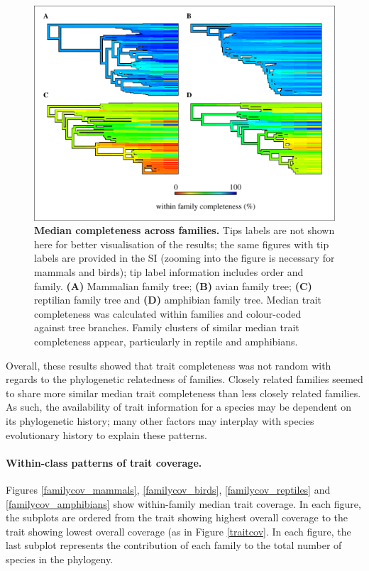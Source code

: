 \begin{figure}[h!]
\centering
\includegraphics[scale=0.75]{figures/chapter2/NA_phylo_patterns/Completeness_all}
\caption[Median completeness across families]{\textbf{Median completeness across families.} Tips labels are not shown here for better visualisation of the results; the same figures with tip labels are provided in the SI (zooming into the figure is necessary for mammals and birds); tip label information includes order and family. \textbf{(A)} Mammalian family tree; \textbf{(B)} avian family tree; \textbf{(C)} reptilian family tree and \textbf{(D)} amphibian family tree. Median trait completeness was calculated within families and colour-coded  against tree branches. Family clusters of similar median trait completeness appear, particularly in reptile and amphibians.}
\label{classcomp}
\end{figure}

Overall, these results showed that trait completeness was not random with regards to the phylogenetic relatedness of families. Closely related families seemed to share more similar median trait completeness than less closely related families. As such, the availability of trait information for a species may be dependent on its phylogenetic history; many other factors may interplay with species evolutionary history to explain these patterns. 

\paragraph{Within-class patterns of trait coverage.} Figures \ref{familycov_mammals}, \ref{familycov_birds}, \ref{familycov_reptiles} and \ref{familycov_amphibians} show within-family median trait coverage. In each figure, the subplots are ordered from the trait showing highest overall coverage to the trait showing lowest overall coverage (as in Figure \ref{traitcov}. In each figure, the last subplot represents the contribution of each family to the total number of species in the phylogeny. 

